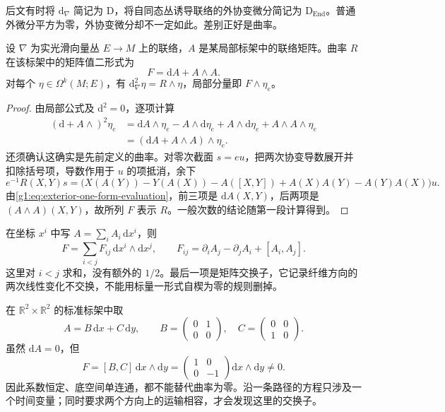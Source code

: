 后文有时将 \(\mathrm{d}_\nabla\) 简记为 \(\mathrm{D}\)，将自同态丛诱导联络的外协变微分简记为 \(\mathrm{D}_{\operatorname{End}}\)。普通外微分平方为零，外协变微分却不一定如此。差别正好是曲率。

\begin{theorem}\label{g1:thm:curvature-structure-equation}
	设 \(\nabla\) 为实光滑向量丛 \(E\to M\) 上的联络，\(A\) 是某局部标架中的联络矩阵。曲率 \(R\) 在该标架中的矩阵值二形式为
	\begin{equation}\label{g1:eq:curvature-matrix}
		F=\mathrm{d}A+A\wedge A.
	\end{equation}
	对每个 \(\eta\in\Omega^k(M;E)\)，有 \(\mathrm{d}_\nabla^2\eta=R\wedge\eta\)，局部分量即 \(F\wedge\eta_e\)。
\end{theorem}
\begin{proof}
	由局部公式及 \(\mathrm{d}^2=0\)，逐项计算
	\begin{align*}
		(\mathrm{d}+A\wedge)^2\eta_e
		&=\mathrm{d}A\wedge\eta_e-A\wedge\mathrm{d}\eta_e
		+A\wedge\mathrm{d}\eta_e+A\wedge A\wedge\eta_e\\
		&=(\mathrm{d}A+A\wedge A)\wedge\eta_e.
	\end{align*}
	还须确认这确实是先前定义的曲率。对零次截面 \(s=e u\)，把两次协变导数展开并扣除括号项，导数作用于 \(u\) 的项抵消，余下
	\[
		e^{-1}R(X,Y)s
		=\bigl(X(A(Y))-Y(A(X))-A([X,Y])
		+A(X)A(Y)-A(Y)A(X)\bigr)u.
	\]
	由\eqref{g1:eq:exterior-one-form-evaluation}，前三项是 \(\mathrm{d}A(X,Y)\)，后两项是 \((A\wedge A)(X,Y)\)，故所列 \(F\) 表示 \(R\)。一般次数的结论随第一段计算得到。
\end{proof}

在坐标 \(x^i\) 中写 \(A=\sum_i A_i\,\mathrm{d}x^i\)，则
\[
	F=\sum_{i<j}F_{ij}\,\mathrm{d}x^i\wedge\mathrm{d}x^j,
	\qquad F_{ij}=\partial_iA_j-\partial_jA_i+[A_i,A_j].
\]
这里对 \(i<j\) 求和，没有额外的 \(1/2\)。最后一项是矩阵交换子，它记录纤维方向的两次线性变化不交换，不能用标量一形式自楔为零的规则删掉。

\begin{example}\label{g1:exm:constant-noncommuting-connection}
	在 \(\mathbb R^2\times\mathbb R^2\) 的标准标架中取
	\[
		A=B\,\mathrm{d}x+C\,\mathrm{d}y,\qquad
		B=\begin{pmatrix}0&1\\0&0\end{pmatrix},\quad
		C=\begin{pmatrix}0&0\\1&0\end{pmatrix}.
	\]
	虽然 \(\mathrm{d}A=0\)，但
	\[
		F=[B,C]\,\mathrm{d}x\wedge\mathrm{d}y
		=\begin{pmatrix}1&0\\0&-1\end{pmatrix}\mathrm{d}x\wedge\mathrm{d}y\ne0.
	\]
	因此系数恒定、底空间单连通，都不能替代曲率为零。沿一条路径的方程只涉及一个时间变量；同时要求两个方向上的运输相容，才会发现这里的交换子。
\end{example}

